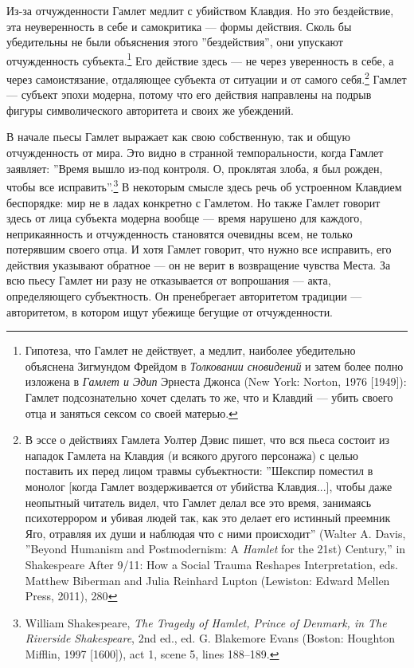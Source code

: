 \documentclass[12pt]{book}
\begin{document}
Из-за отчужденности Гамлет медлит с убийством Клавдия. Но это бездействие, эта неуверенность в себе и самокритика --- формы действия. Сколь бы убедительны не были объяснения этого ''бездействия'', они упускают отчужденность субъекта.\footnote{Гипотеза, что Гамлет не действует, а медлит, наиболее убедительно объяснена Зигмундом Фрейдом в \textit{Толковании сновидений} и затем более полно изложена в \textit{Гамлет и Эдип} Эрнеста Джонса (New York: Norton, 1976 [1949]): Гамлет подсознательно хочет сделать то же, что и Клавдий --- убить своего отца и заняться сексом со своей матерью.} Его действие здесь --- не через уверенность в себе, а через самоистязание, отдаляющее субъекта от ситуации и от самого себя.\footnote{В эссе о действиях Гамлета Уолтер Дэвис пишет, что вся пьеса состоит из нападок Гамлета на Клавдия (и всякого другого персонажа) с целью поставить их перед лицом травмы субъектности: ''Шекспир поместил в монолог [когда Гамлет воздерживается от убийства Клавдия...], чтобы даже неопытный читатель видел, что Гамлет делал все это время, занимаясь психотеррором и убивая людей так, как это делает его истинный преемник Яго, отравляя их души и наблюдая что с ними происходит'' (Walter A. Davis, ''Beyond Humanism and Postmodernism: A \textit{Hamlet} for the 21st) Century,'' in Shakespeare After 9/11: How a Social Trauma Reshapes Interpretation, eds. Matthew Biberman and Julia Reinhard Lupton (Lewiston: Edward Mellen Press, 2011), 280} Гамлет --- субъект эпохи модерна, потому что его действия направлены на подрыв фигуры символического авторитета и своих же убеждений.

В начале пьесы Гамлет выражает как свою собственную, так и общую отчужденность от мира. Это видно в странной темпоральности, когда Гамлет заявляет: ''Время вышло из-под контроля. О, проклятая злоба, я был рожден, чтобы все исправить''.\footnote{William Shakespeare, \textit{The Tragedy of Hamlet, Prince of Denmark, in The Riverside Shakespeare}, 2nd ed., ed. G. Blakemore Evans (Boston: Houghton Mifflin, 1997 [1600]), act 1, scene 5, lines 188–189.} В некоторым смысле здесь речь об устроенном Клавдием беспорядке: мир не в ладах конкретно с Гамлетом. Но также Гамлет говорит здесь от лица субъекта модерна вообще --- время нарушено для каждого, неприкаянность и отчужденность становятся очевидны всем, не только потерявшим своего отца. И хотя Гамлет говорит, что нужно все исправить, его действия указывают обратное --- он не верит в возвращение чувства Места. За всю пьесу Гамлет ни разу не отказывается от вопрошания --- акта, определяющего субъектность. Он пренебрегает авторитетом традиции --- авторитетом, в котором ищут убежище бегущие от отчужденности.
\end{document}
